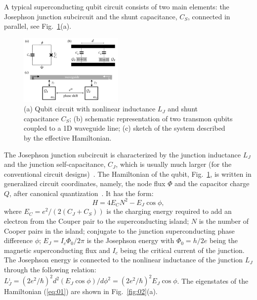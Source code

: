 \documentclass[lettersize,journal]{IEEEtran}
\begin{document}
A typical superconducting qubit circuit consists of two main elements: the Josephson junction subcircuit and the shunt capacitance, $C_S$, connected in parallel, see Fig.~\ref{fig:01}(a). 

\begin{figure}[h]
    \centering
    \includegraphics[width=0.45\textwidth]{fig_1}
    \caption{(a) Qubit circuit with nonlinear inductance $L_J$ and shunt capacitance $C_S$; (b) schematic representation of two transmon qubits coupled to a 1D waveguide line; (c) sketch of the system described by the effective Hamiltonian.}
    \label{fig:01}
\end{figure}

The Josephson junction subcircuit is characterized by the junction inductance $L_J$ and the junction self-capacitance, $C_J$, which is usually much larger (for the conventional circuit designs)~\cite{krantz_quantum_2019}.
The Hamiltonian of the qubit, Fig.~\ref{fig:01}, is written in generalized circuit coordinates, namely, the node flux $\Phi$ and the capacitor charge $Q$, after canonical quantization~\cite{}.
It has the form:
\begin{equation}\label{eq:01}
    H = 4 E_C N^2 - E_J \cos \phi,
\end{equation}
where $E_C = e^2 / (2 (C_J + C_S))$ is the charging energy required to add an electron from the Couper pair to the superconducting island; $N$ is the number of Cooper pairs in the island; conjugate to the junction superconducting phase difference $\phi$; $E_J = I_c \Phi_0 / 2\pi$ is the Josephson energy with $\Phi_0 = h / 2e$ being the magnetic superconducting flux and $I_c$ being the critical current of the junction.
The Josephson energy is connected to the nonlinear inductance of the junction $L_J$ through the following relation: $L_J^{_1} = (2e^2 / \hbar)^2 d^2(E_J \cos \phi) / d\phi^2 = (2e^2 / \hbar)^2 E_J \cos \phi$. 
The eigenstates of the Hamiltonian (\ref{eq:01}) are shown in Fig.~\ref{fig:02}(a).
\end{document}

